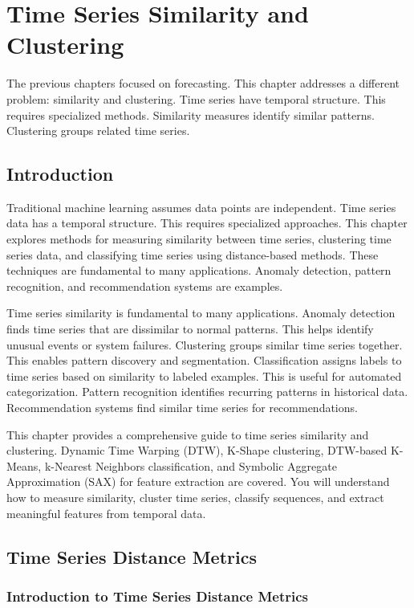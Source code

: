 \chapter{Time Series Similarity and Clustering}

The previous chapters focused on forecasting. This chapter addresses a different problem: similarity and clustering. Time series have temporal structure. This requires specialized methods. Similarity measures identify similar patterns. Clustering groups related time series.

\section{Introduction}

Traditional machine learning assumes data points are independent. Time series data has a temporal structure. This requires specialized approaches. This chapter explores methods for measuring similarity between time series, clustering time series data, and classifying time series using distance-based methods. These techniques are fundamental to many applications. Anomaly detection, pattern recognition, and recommendation systems are examples.

Time series similarity is fundamental to many applications. Anomaly detection finds time series that are dissimilar to normal patterns. This helps identify unusual events or system failures. Clustering groups similar time series together. This enables pattern discovery and segmentation. Classification assigns labels to time series based on similarity to labeled examples. This is useful for automated categorization. Pattern recognition identifies recurring patterns in historical data. Recommendation systems find similar time series for recommendations.

This chapter provides a comprehensive guide to time series similarity and clustering. Dynamic Time Warping (DTW), K-Shape clustering, DTW-based K-Means, k-Nearest Neighbors classification, and Symbolic Aggregate Approximation (SAX) for feature extraction are covered. You will understand how to measure similarity, cluster time series, classify sequences, and extract meaningful features from temporal data.

\section{Time Series Distance Metrics}

\subsection{Introduction to Time Series Distance Metrics}

